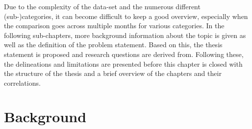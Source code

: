 Due to the complexity of the data-set and the numerous different (sub-)categories, it can become difficult to keep a good overview, especially when the comparison goes across multiple months for various categories. \newline
In the following sub-chapters, more background information about the topic is given as well as the definition of the problem statement. Based on this, the thesis statement is proposed and research questions are derived from. Following these, the delineations and limitations are presented before this chapter is closed with the structure of the thesis and a brief overview of the chapters and their correlations.



\section{Background}

